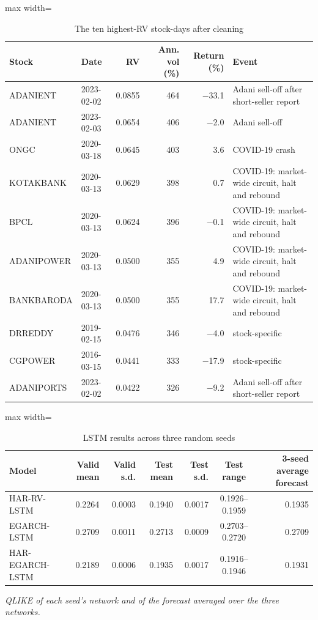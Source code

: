 \documentclass[11pt,a4paper]{article}
\begin{document}
\begin{table}[H]
\centering
\caption{The ten highest-RV stock-days after cleaning}
\label{tab:topdays}
\small
\begin{adjustbox}{max width=\textwidth}
\begin{tabular}{llrrrl}
\toprule
Stock & Date & RV & Ann. vol (\%) & Return (\%) & Event \\
\midrule
ADANIENT & 2023-02-02 & 0.0855 & 464 & $-$33.1 & Adani sell-off after short-seller report \\
ADANIENT & 2023-02-03 & 0.0654 & 406 & $-$2.0 & Adani sell-off \\
ONGC & 2020-03-18 & 0.0645 & 403 & 3.6 & COVID-19 crash \\
KOTAKBANK & 2020-03-13 & 0.0629 & 398 & 0.7 & COVID-19: market-wide circuit, halt and rebound \\
BPCL & 2020-03-13 & 0.0624 & 396 & $-$0.1 & COVID-19: market-wide circuit, halt and rebound \\
ADANIPOWER & 2020-03-13 & 0.0500 & 355 & 4.9 & COVID-19: market-wide circuit, halt and rebound \\
BANKBARODA & 2020-03-13 & 0.0500 & 355 & 17.7 & COVID-19: market-wide circuit, halt and rebound \\
DRREDDY & 2019-02-15 & 0.0476 & 346 & $-$4.0 & stock-specific \\
CGPOWER & 2016-03-15 & 0.0441 & 333 & $-$17.9 & stock-specific \\
ADANIPORTS & 2023-02-02 & 0.0422 & 326 & $-$9.2 & Adani sell-off after short-seller report \\
\bottomrule
\end{tabular}
\end{adjustbox}
\end{table}

\begin{table}[H]
\centering
\caption{LSTM results across three random seeds}
\label{tab:seeds}
\small
\begin{adjustbox}{max width=\textwidth}
\begin{tabular}{lrrrrcr}
\toprule
Model & Valid mean & Valid s.d. & Test mean & Test s.d. & Test range & 3-seed average forecast \\
\midrule
HAR-RV-LSTM & 0.2264 & 0.0003 & 0.1940 & 0.0017 & 0.1926--0.1959 & 0.1935 \\
EGARCH-LSTM & 0.2709 & 0.0011 & 0.2713 & 0.0009 & 0.2703--0.2720 & 0.2709 \\
HAR-EGARCH-LSTM & 0.2189 & 0.0006 & 0.1935 & 0.0017 & 0.1916--0.1946 & 0.1931 \\
\bottomrule
\end{tabular}
\end{adjustbox}
\par\smallskip\parbox{0.95\textwidth}{\footnotesize\itshape QLIKE of each seed's network and of the forecast averaged over the three networks.}
\end{table}
\end{document}
